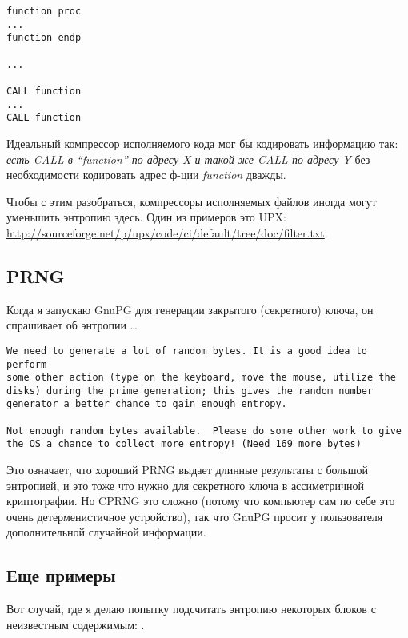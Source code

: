 \begin{lstlisting}[style=customasmx86]
function proc
...
function endp

...

CALL function
...
CALL function
\end{lstlisting}

Идеальный компрессор исполняемого кода мог бы кодировать информацию так:
\emph{есть CALL в ``function'' по адресу X и такой же CALL по адресу Y} без необходимости кодировать
адрес ф-ции \emph{function} дважды.

Чтобы с этим разобраться, компрессоры исполняемых файлов иногда могут уменьшить энтропию здесь.
Один из примеров это UPX: \url{http://sourceforge.net/p/upx/code/ci/default/tree/doc/filter.txt}.

\subsection{\ac{PRNG}}

Когда я запускаю GnuPG для генерации закрытого (секретного) ключа, он спрашивает об энтропии \dots

\begin{lstlisting}
We need to generate a lot of random bytes. It is a good idea to perform
some other action (type on the keyboard, move the mouse, utilize the
disks) during the prime generation; this gives the random number
generator a better chance to gain enough entropy.

Not enough random bytes available.  Please do some other work to give
the OS a chance to collect more entropy! (Need 169 more bytes)
\end{lstlisting}

Это означает, что хороший \ac{PRNG} выдает длинные результаты с большой энтропией,
и это тоже что нужно для секретного ключа в ассиметричной криптографии.
Но \ac{CPRNG} это сложно (потому что компьютер сам по себе это очень детерменистичное устройство),
так что GnuPG просит у пользователя дополнительной случайной информации.

\subsection{Еще примеры}

Вот случай, где я делаю попытку подсчитать энтропию некоторых блоков с неизвестным содержимым: .




